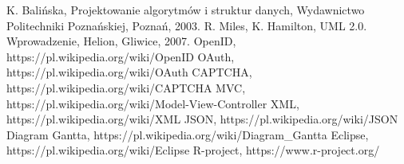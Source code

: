 \newpage
   \begin{thebibliography}{99}
		 K. Balińska, Projektowanie algorytmów i struktur danych, Wydawnictwo Politechniki Poznańskiej, Poznań, 2003. 
		 R. Miles, K. Hamilton, UML 2.0. Wprowadzenie, Helion, Gliwice, 2007. 
		 OpenID, https://pl.wikipedia.org/wiki/OpenID
		 OAuth, https://pl.wikipedia.org/wiki/OAuth
		 CAPTCHA, https://pl.wikipedia.org/wiki/CAPTCHA
		 MVC, https://pl.wikipedia.org/wiki/Model-View-Controller
		 XML, https://pl.wikipedia.org/wiki/XML
		 JSON, https://pl.wikipedia.org/wiki/JSON
		 Diagram Gantta, https://pl.wikipedia.org/wiki/Diagram\_Gantta
		 Eclipse, https://pl.wikipedia.org/wiki/Eclipse
		 R-project, https://www.r-project.org/
	 \end{thebibliography}
 
